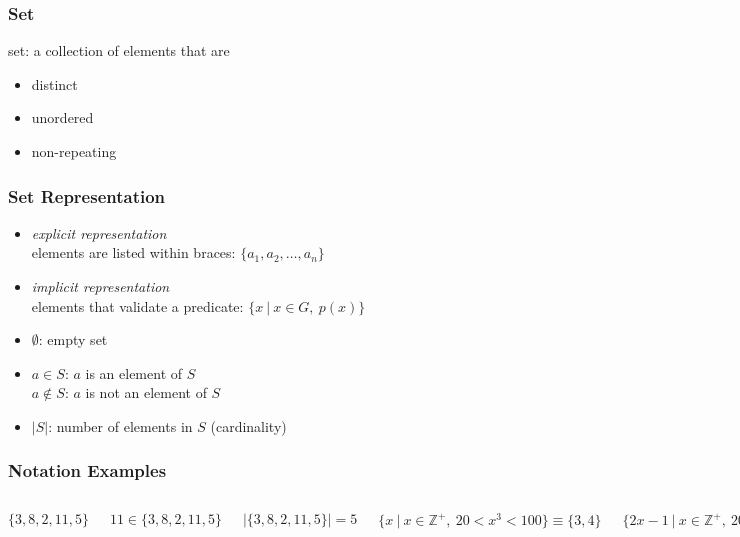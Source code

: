 \documentclass[dvipsnames]{beamer}
\begin{document}
\begin{frame}
  \frametitle{Set}

  \begin{definition}
    \alert{set}: a collection of elements that are
    \begin{itemize}
      \item distinct
      \item unordered
      \item non-repeating
    \end{itemize}
  \end{definition}
\end{frame}

\begin{frame}
  \frametitle{Set Representation}

  \begin{itemize}
    \item \emph{explicit representation}\\
      elements are listed within braces: $\{a_1, a_2, \dots, a_n\}$

    \pause
    \medskip
    \item \emph{implicit representation}\\
      elements that validate a predicate: $\{x~|~x \in G,~p(x)\}$

    \pause
    \medskip
    \item $\emptyset$: empty set

    \pause
    \medskip
    \item $a \in S$: $a$ is an element of $S$\\
      $a \notin S$: $a$ is not an element of $S$

    \pause
    \medskip
    \item $|S|$: number of elements in $S$ (\alert{cardinality})
  \end{itemize}
\end{frame}

\begin{frame}
  \frametitle{Notation Examples}

  \begin{columns}[t]
    $\{3,8,2,11,5\}$

    \medskip
    $11 \in \{3,8,2,11,5\}$

    \medskip
    $|\{3,8,2,11,5\}|=5$

    \pause
    $\{x~|~x \in \mathbb{Z}^+,~20 < x^3 < 100\} \equiv \{3,4\}$

    \medskip
    $\{2x-1~|~x \in \mathbb{Z}^+,~20 < x^3 < 100\} \equiv \{5,7\}$

    \pause
    \medskip
    $\{n~|~n \in \mathbb{N},~\exists k \in \mathbb{N}~[n=2k]\}$\\
  \end{columns}
\end{frame}
\end{document}
